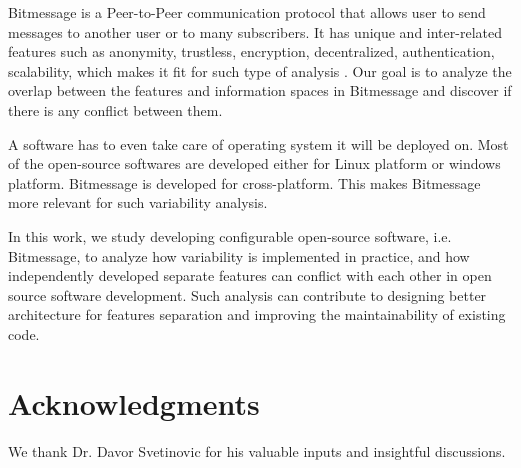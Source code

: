 \documentclass{acm_proc_article-sp}
\begin{document}
Bitmessage is a Peer-to-Peer communication protocol that allows user to send messages to another user or to many subscribers. It has unique and inter-related features such as anonymity, trustless, encryption, decentralized, authentication, scalability,
which makes it fit for such type of analysis \cite{Warren}. Our goal is to analyze the overlap between the features and information spaces in Bitmessage and discover if there is any conflict between them.

A software %
has to even take care of operating system it will be deployed on. Most of the open-source softwares are developed either for Linux platform or windows platform. Bitmessage is developed for cross-platform. This makes Bitmessage more relevant for such variability analysis.



In this work, we study developing configurable open-source software, i.e. Bitmessage, to analyze how variability is implemented in practice, and how independently developed separate features can conflict with each other in open source software development. Such analysis can contribute to designing better architecture for features separation and improving the maintainability of existing code.





\section{Acknowledgments}
We thank Dr. Davor Svetinovic for his valuable inputs and insightful discussions.
%
\end{document}
